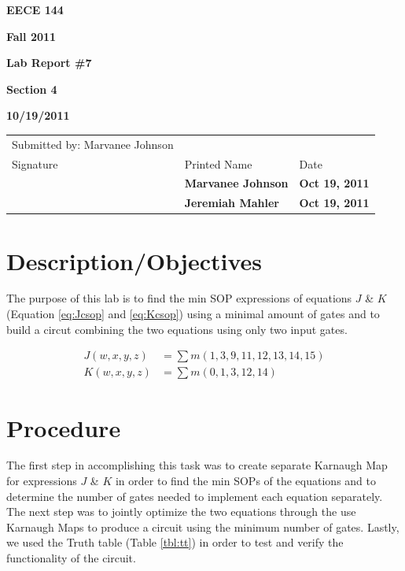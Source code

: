 \documentclass[12pt]{article}
\begin{document}
\centerline{\bf EECE 144}
\centerline{\bf Fall 2011}
\centerline{\bf}
\centerline{\bf Lab Report \#7}
\centerline{\bf Section 4}
\centerline{\bf 10/19/2011}
\begin{center}
\begin{tabularx}{\textwidth}[b]{X l l}
Submitted by: Marvanee Johnson & & \\
Signature & Printed Name & Date \\
\hline
\multicolumn{1}{|X|}{} & \multicolumn{1}{|l|}{\bigstrut \bf Marvanee Johnson} & \multicolumn{1}{|l|}{\bf Oct 19, 2011} \\
\hline
\multicolumn{1}{|X|}{} & \multicolumn{1}{|l|}{\bigstrut \bf Jeremiah Mahler} & \multicolumn{1}{|l|}{\bf Oct 19, 2011} \\
\hline
\end{tabularx}
\end{center}

\section{Description/Objectives}
The purpose of this lab is to find the min SOP expressions of equations $J$ \& $K$
(Equation \ref{eq:Jcsop} and \ref{eq:Kcsop}) using a minimal amount of gates
and to build a circut combining the two equations using only two input gates.

\begin{align}
J(w, x, y, z) &= \sum m(1,3,9,11,12,13,14,15) \label{eq:Jcsop} \\
K(w, x, y, z) &= \sum m(0,1,3,12,14) \label{eq:Kcsop}
\end{align}
\section{Procedure}
\label{sec:procedure}
The first step in accomplishing this task was to create separate
Karnaugh Map for expressions $J$ \& $K$ in order to find the min SOPs of the
equations and to determine the number of gates needed to implement each
equation separately. The next step was to jointly optimize the two equations
through the use Karnaugh Maps to produce a circuit using the minimum number
of gates.
Lastly, we used the Truth table (Table \ref{tbl:tt}) in order to test
and verify the functionality of the circuit.
\end{document}
